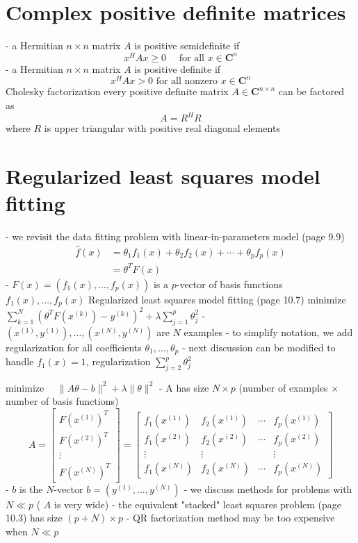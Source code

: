 \section{Complex positive definite matrices}


- a Hermitian $n \times n$ matrix $A$ is positive semidefinite if
$$
x^{H} A x \geq 0 \quad \text { for all } x \in \mathbf{C}^{n}
$$
- a Hermitian $n \times n$ matrix $A$ is positive definite if
$$
x^{H} A x>0 \text { for all nonzero } x \in \mathbf{C}^{n}
$$
Cholesky factorization
every positive definite matrix $A \in \mathbf{C}^{n \times n}$ can be factored as
$$
A=R^{H} R
$$
where $R$ is upper triangular with positive real diagonal elements

\section{Regularized least squares model fitting}

- we revisit the data fitting problem with linear-in-parameters model (page 9.9)
$$
\begin{aligned}
\hat{f}(x) &=\theta_{1} f_{1}(x)+\theta_{2} f_{2}(x)+\cdots+\theta_{p} f_{p}(x) \\
&=\theta^{T} F(x)
\end{aligned}
$$
- $F(x)=\left(f_{1}(x), \ldots, f_{p}(x)\right)$ is a $p$-vector of basis functions $f_{1}(x), \ldots, f_{p}(x)$
Regularized least squares model fitting (page 10.7)
minimize $\sum_{k=1}^{N}\left(\theta^{T} F\left(x^{(k)}\right)-y^{(k)}\right)^{2}+\lambda \sum_{j=1}^{p} \theta_{j}^{2}$
- $\left(x^{(1)}, y^{(1)}\right), \ldots,\left(x^{(N)}, y^{(N)}\right)$ are $N$ examples
- to simplify notation, we add regularization for all coefficients $\theta_{1}, \ldots, \theta_{p}$
- next discussion can be modified to handle $f_{1}(x)=1$, regularization $\sum_{j=2}^{p} \theta_{j}^{2}$

minimize $\quad\|A \theta-b\|^{2}+\lambda\|\theta\|^{2}$
- A has size $N \times p$ (number of examples $\times$ number of basis functions)
$$
A=\left[\begin{array}{c}
F\left(x^{(1)}\right)^{T} \\
F\left(x^{(2)}\right)^{T} \\
\vdots \\
F\left(x^{(N)}\right)^{T}
\end{array}\right]=\left[\begin{array}{cccc}
f_{1}\left(x^{(1)}\right) & f_{2}\left(x^{(1)}\right) & \cdots & f_{p}\left(x^{(1)}\right) \\
f_{1}\left(x^{(2)}\right) & f_{2}\left(x^{(2)}\right) & \cdots & f_{p}\left(x^{(2)}\right) \\
\vdots & \vdots & & \vdots \\
f_{1}\left(x^{(N)}\right) & f_{2}\left(x^{(N)}\right) & \cdots & f_{p}\left(x^{(N)}\right)
\end{array}\right]
$$
- $b$ is the $N$-vector $b=\left(y^{(1)}, \ldots, y^{(N)}\right)$
- we discuss methods for problems with $N \ll p$ ( $A$ is very wide)
- the equivalent "stacked" least squares problem (page 10.3) has size $(p+N) \times p$
- QR factorization method may be too expensive when $N \ll p$

